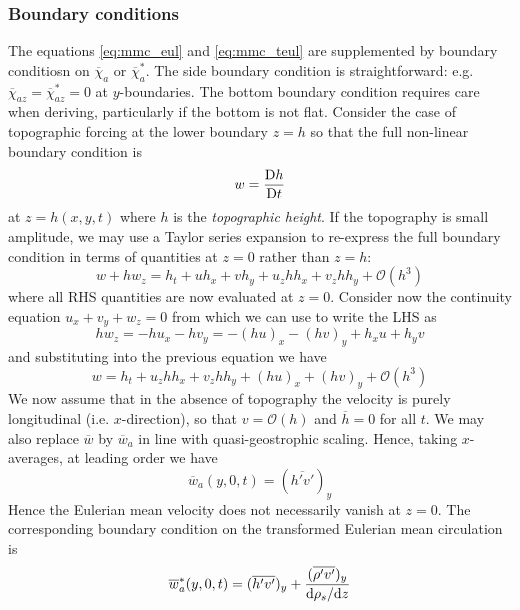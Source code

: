\documentclass{jknotes}
\begin{document}
\subsubsection{Boundary conditions}
The equations \eqref{eq:mmc_eul} and \eqref{eq:mmc_teul} are supplemented by
boundary conditiosn on $\overline{\chi}_a$ or $\overline{\chi}_a^*$. The side
boundary condition is straightforward: e.g. $\overline{\chi}_{az} =
\overline{\chi}^*_{az} = 0$ at $y$-boundaries. The bottom boundary condition
requires care when deriving, particularly if the bottom is not flat. Consider
the case of topographic forcing at the lower boundary $z=h$ so that the full
non-linear boundary condition is
\begin{equation}
	w = \frac{\mathrm{D} h}{\mathrm{D} t}
\end{equation}
at $z=h(x,y,t)$ where $h$ is the \emph{topographic height}. If the topography
is small amplitude, we may use a Taylor series expansion to re-express the
full boundary condition in terms of quantities at $z=0$ rather than $z=h$:
\begin{equation}
	w+hw_z = h_t + uh_x + vh_y + u_z h h_x + v_z h h_y + \mathcal{O}(h^3)
\end{equation}
where all RHS quantities are now evaluated at $z=0$. Consider now the
continuity equation $u_x + v_y + w_z = 0$ from which we can use to write the
LHS as
\begin{equation}
	hw_z = -hu_x -hv_y = -(hu)_x - (hv)_y + h_x u + h_y v
\end{equation}
and substituting into the previous equation we have
\begin{equation}
	w = h_t + u_z h h_x + v_z h h_y + (hu)_x + (hv)_y + \mathcal{O}(h^3)
\end{equation}
We now assume that in the absence of topography the velocity is purely
longitudinal (i.e. $x$-direction), so that $v = \mathcal{O}(h)$ and
$\overline{h} = 0$ for all $t$. We may also replace $\overline{w}$ by
$\overline{w}_a$ in line with quasi-geostrophic scaling. Hence, taking
$x$-averages, at leading order we have
\begin{equation}
	\overline{w}_a(y,0,t) = (\overline{h'v'})_y
\end{equation}
Hence the Eulerian mean velocity does not necessarily vanish at $z=0$. The
corresponding boundary condition on the transformed Eulerian mean circulation
is
\begin{equation}
	\overline{w}_a^*(y,0,t) = (\overline{h'v'})_y +
	\frac{(\overline{\rho'v'})_y}{\diffd \rho_s/\diffd z}
\end{equation}
\end{document}
